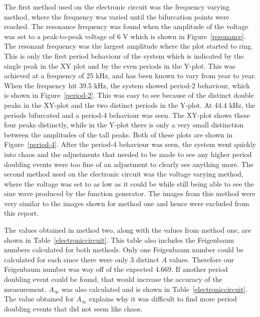 \documentclass[12pt]{report}
\theoremstyle{definition}
\begin{document}
The first method used on the electronic circuit was the frequency varying method, where the frequency was varied until the bifurcation points were reached. The resonance frequency was found when the amplitude of the voltage was set to a peak-to-peak voltage of 6 V which is shown in Figure~\ref{resonance}. The resonant frequency was the largest amplitude where the plot started to ring. This is only the first period behaviour of the system which is indicated by the single peak in the XY plot and by the even periods in the Y-plot. This was achieved at a frequency of 25 kHz, and has been known to vary from year to year. When the frequency hit 39.5 kHz, the system showed period-2 behaviour, which is shown in Figure~\ref{period-2}. This was easy to see because of the distinct double peaks in the XY-plot and the two distinct periods in the Y-plot. At 44.4 kHz, the periods bifurcated and a period-4 behaviour was seen. The XY-plot shows these four peaks distinctly, while in the Y-plot there is only a very small distinction between the amplitudes of the tall peaks. Both of these plots are shown in Figure~\ref{period-4}. After the period-4 behaviour was seen, the system went quickly into chaos and the adjustments that needed to be made to see any higher period doubling events were too fine of an adjustment to clearly see anything more.
The second method used on the electronic circuit was the voltage varying method, where the voltage was set to as low as it could be while still being able to see the sine wave produced by the function generator. The images from this method were very similar to the images shown for method one and hence were excluded from this report. 

The values obtained in method two, along with the values from method one, are shown in Table~\ref{electroniccircuit}. This table also includes the Feigenbaum numbers calculated for both methods. Only one Feigenbaum number could be calculated for each since there were only 3 distinct $A$ values. Therefore our Feigenbaum number was way off of the expected 4.669. If another period doubling event could be found, that would increase the accuracy of the measurement. $A_\infty$ was also calculated and is shown in Table~\ref{electroniccircuit}. The value obtained for $A_\infty$ explains why it was difficult to find more period doubling events that did not seem like chaos. 





%
%
\end{document}
